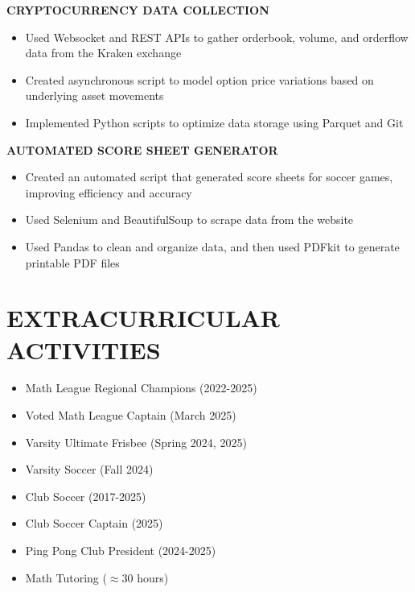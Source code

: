 \documentclass[11pt,letterpaper]{article}
\begin{document}
\begin{flushleft}
  \textbf{CRYPTOCURRENCY DATA COLLECTION}
  \begin{itemize}[leftmargin=*,nosep]
    \item Used Websocket and REST APIs to gather orderbook, volume, and orderflow data from the Kraken exchange 
    \item Created asynchronous script to model option price variations based on underlying asset movements
    \item Implemented Python scripts to optimize data storage using Parquet and Git
  \end{itemize}
\end{flushleft}

\begin{flushleft}
  \textbf{AUTOMATED SCORE SHEET GENERATOR}
  \begin{itemize}[leftmargin=*,nosep]
    \item Created an automated script that generated score sheets for soccer games, improving efficiency and accuracy
    \item Used Selenium and BeautifulSoup to scrape data from the website
    \item Used Pandas to clean and organize data, and then used PDFkit to generate printable PDF files 
  \end{itemize}
\end{flushleft}

\vspace{1em}
\section{EXTRACURRICULAR ACTIVITIES}

\vspace{0.5em}
\begin{itemize}[leftmargin=*,nosep]
  \item Math League Regional Champions (2022-2025)
  \item Voted Math League Captain (March 2025)
  \item Varsity Ultimate Frisbee (Spring 2024, 2025)
  \item Varsity Soccer (Fall 2024)
  \item Club Soccer (2017-2025)
  \item Club Soccer Captain (2025)
  \item Ping Pong Club President (2024-2025)
  \item Math Tutoring ($\approx30$ hours)
\end{itemize}
\end{document}

